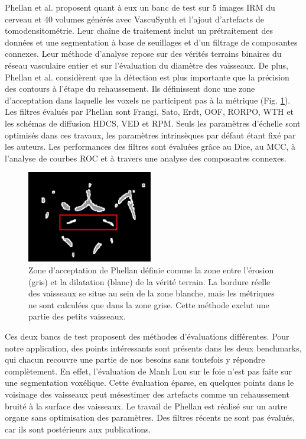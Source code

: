 Phellan et al. proposent quant à eux un banc de test sur 5 images IRM du cerveau et 40 volumes générés avec VascuSynth et l'ajout d'artefacts de tomodensitométrie. Leur chaîne de traitement inclut un prétraitement des données et une segmentation à base de seuillages et d'un filtrage de composantes connexes. Leur méthode d'analyse repose sur des vérités terrains binaires du réseau vasculaire entier et sur l'évaluation du diamètre des vaisseaux. De plus, Phellan et al. considèrent que la détection est plus importante que la précision des contours à l'étape du rehaussement. Ils définissent donc une zone d'acceptation dans laquelle les voxels ne participent pas à la métrique (Fig. \ref{fig:Phellan_acceptance_zone}). Les filtres évalués par Phellan sont Frangi, Sato, Erdt, OOF, RORPO, WTH et les schémas de diffusion HDCS, VED et RPM. Seuls les paramètres d'échelle sont optimisés dans ces travaux, les paramètres intrinsèques par défaut étant fixé par les auteurs. Les performances des filtres sont évaluées grâce au Dice, au MCC, à l'analyse de courbes ROC et à travers une analyse des composantes connexes.

\begin{figure}[!ht]
  \centering
  \includegraphics[height=4cm]{Images/Phellan_comparison.jpg}
  \caption{Zone d'acceptation de Phellan définie comme la zone entre l'érosion (gris) et la dilatation (blanc) de la vérité terrain. La bordure réelle des vaisseaux se situe au sein de la zone blanche, mais les métriques ne sont calculées que dans la zone grise. Cette méthode exclut une partie des petits vaisseaux.}
  \label{fig:Phellan_acceptance_zone}
\end{figure}

Ces deux bancs de test proposent des méthodes d'évaluations différentes. Pour notre application, des points intéressants sont présents dans les deux benchmarks, qui chacun recouvre une partie de nos besoins sans toutefois y répondre complètement. En effet, l'évaluation de Manh Luu sur le foie n'est pas faite sur une segmentation voxélique. Cette évaluation éparse, en quelques points dans le voisinage des vaisseaux peut mésestimer des artefacts comme un rehaussement bruité à la surface des vaisseaux. Le travail de Phellan est réalisé sur un autre organe sans optimisation des paramètres. Des filtres récents ne sont pas évalués, car ils sont postérieurs aux publications. 

